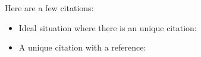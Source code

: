 \documentclass{article}
\begin{document}
Here are a few citations:
\begin{itemize}
    \item
        Ideal situation where there is an unique citation:  \cite{stein:iwasawa}
    \item
        A unique citation with a reference: \cite[Prop. 14.2]{mazur:eisenstein}
\end{itemize}
    


\end{document}

